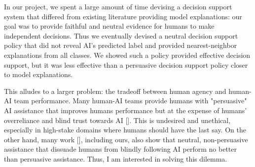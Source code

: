 

In our project, we spent a large amount of time devising a decision support system that differed from existing literature providing model explanations: our goal was to provide faithful and neutral evidence for humans to make independent decisions. Thus we eventually devised a neutral decision support policy that did not reveal AI's predicted label and provided nearest-neighbor explanations from all classes. 
We showed such a policy provided effective decision support, but it was less effective than a persuasive decision support policy closer to model explanations. 

This alludes to a larger problem: the tradeoff between human agency and human-AI team performance. 
Many human-AI teams provide humans with "persuasive" AI assistance that improves humans performance but at the expense of humans' overreliance and blind trust towards AI []. This is undesired and unethical, especially in high-stake domains where humans should have the last say.
On the other hand, many work [], including ours, also show that neutral, non-persuasive assistance that dissuade humans from blindly following AI perform no better than persuasive assistance. 
Thus, I am interested in solving this dilemma.








